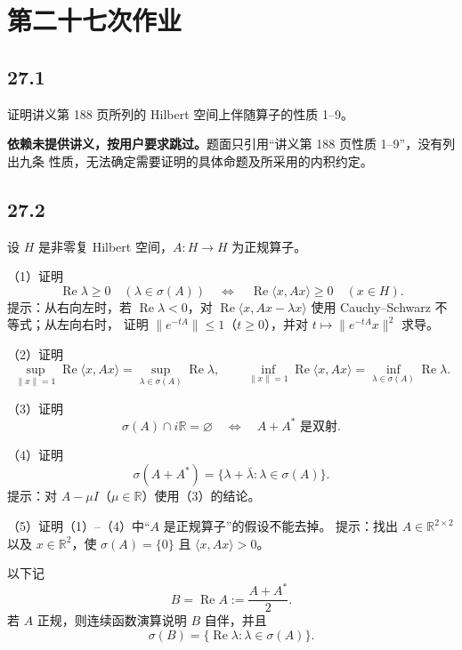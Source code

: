 \section{第二十七次作业}

\subsection*{27.1}
\begin{problem}
证明讲义第 188 页所列的 Hilbert 空间上伴随算子的性质 1--9。
\end{problem}

\textbf{依赖未提供讲义，按用户要求跳过。}题面只引用“讲义第 188 页性质 1--9”，没有列出九条
性质，无法确定需要证明的具体命题及所采用的内积约定。

\subsection*{27.2}
\begin{problem}
设 $H$ 是非零复 Hilbert 空间，$A:H\to H$ 为正规算子。

（1）证明
\[
 \operatorname{Re}\lambda\geq0\quad(\lambda\in\sigma(A))
 \quad\Longleftrightarrow\quad
 \operatorname{Re}\langle x,Ax\rangle\geq0\quad(x\in H).
\]
提示：从右向左时，若 $\operatorname{Re}\lambda<0$，对
$\operatorname{Re}\langle x,Ax-\lambda x\rangle$ 使用 Cauchy--Schwarz 不等式；从左向右时，
证明 $\|e^{-tA}\|\leq1$（$t\geq0$），并对 $t\mapsto\|e^{-tA}x\|^2$ 求导。

（2）证明
\[
 \sup_{\|x\|=1}\operatorname{Re}\langle x,Ax\rangle
 =\sup_{\lambda\in\sigma(A)}\operatorname{Re}\lambda,
 \qquad
 \inf_{\|x\|=1}\operatorname{Re}\langle x,Ax\rangle
 =\inf_{\lambda\in\sigma(A)}\operatorname{Re}\lambda.
\]

（3）证明
\[
 \sigma(A)\cap i\mathbb R=\varnothing
 \quad\Longleftrightarrow\quad A+A^*\text{ 是双射}.
\]

（4）证明
\[
 \sigma(A+A^*)=\{\lambda+\bar\lambda:\lambda\in\sigma(A)\}.
\]
提示：对 $A-\mu I$（$\mu\in\mathbb R$）使用（3）的结论。

（5）证明（1）--（4）中“$A$ 是正规算子”的假设不能去掉。
提示：找出 $A\in\mathbb R^{2\times2}$ 以及 $x\in\mathbb R^2$，使
$\sigma(A)=\{0\}$ 且 $\langle x,Ax\rangle>0$。
\end{problem}

以下记
\[
 B=\operatorname{Re}A:=\frac{A+A^*}{2}.
\]
若 $A$ 正规，则连续函数演算说明 $B$ 自伴，并且
\[
 \sigma(B)=\{\operatorname{Re}\lambda:\lambda\in\sigma(A)\}. \tag{27.1}
\]

